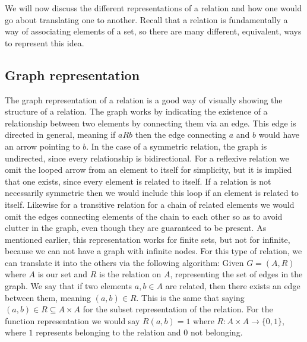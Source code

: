 \documentclass{article}
\begin{document}
We will now discuss the different representations of a relation and how one would go about translating one to another. Recall that a relation is fundamentally a way of associating elements of a set, so there are many different, equivalent, ways to represent this idea.

\subsection{Graph representation} %
The graph representation of a relation is a good way of visually showing the structure of a relation. The graph works by indicating the existence of a relationship between two elements by connecting them via an edge. This edge is directed in general, meaning if $aRb$ then the edge connecting $a$ and $b$ would have an arrow pointing to $b$. In the case of a symmetric relation, the graph is undirected, since every relationship is bidirectional. For a reflexive relation we omit the looped arrow from an element to itself for simplicity, but it is implied that one exists, since every element is related to itself. If a relation is not necessarily symmetric then we would include this loop if an element is related to itself. Likewise for a transitive relation for a chain of related elements we would omit the edges connecting elements of the chain to each other so as to avoid clutter in the graph, even though they are guaranteed to be present. As mentioned earlier, this representation works for finite sets, but not for infinite, because we can not have a graph with infinite nodes. For this type of relation, we can translate it into the others via the following algorithm: Given $G = (A,R)$ where $A$ is our set and $R$ is the relation on $A$, representing the set of edges in the graph. We say that if two elements $a,b\in A$ are related, then there exists an edge between them, meaning $(a,b)\in R$. This is the same that saying $(a,b)\in R \subseteq A\times A$ for the subset representation of the relation. For the function representation we would say $R(a,b) = 1$ where $R:A\times A\to \{0,1\}$, where $1$ represents belonging to the relation and $0$ not belonging.  
\end{document}
